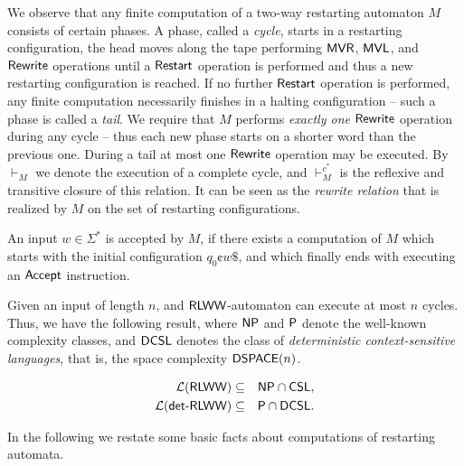 We observe that any finite computation of a two-way restarting automaton $M$ consists of certain phases. A phase, called a \emph{cycle}, starts in a restarting configuration, the head moves along the tape performing \index{$\MVR$}$\MVR$, \index{$\MVL$}$\MVL$, and \index{$\Rewrite$}$\Rewrite$ operations until a \index{$\Restart$}$\Restart$ operation is performed and thus a new restarting configuration is reached. If no further \index{$\Restart$}$\Restart$ operation is performed, any finite computation necessarily finishes in a halting configuration -- such a phase is called a \emph{tail}. We require that $M$ performs \emph{exactly one} \index{$\Rewrite$}$\Rewrite$ operation during any cycle -- thus each new phase starts on a shorter word than the previous one. During a tail at most one \index{$\Rewrite$}$\Rewrite$ operation may be executed. By $\vdash_M$ we denote the execution of a complete cycle, and $\vdash_M^{c^*}$ is the reflexive and transitive closure of this relation. It can be seen as the \emph{rewrite relation} that is realized by $M$ on the set of restarting configurations.

An input $w \in \Sigma^*$ is accepted by $M$, if there exists a computation of $M$ which starts with the initial configuration  $q_0 \cent w \$$, and which finally ends with executing an \index{$\Accept$}$\Accept$ instruction.

Given an input of length $n$, and $\textup{\sf RLWW}$-automaton can execute at most $n$ cycles. Thus, we have the following result, where $\textup{\sf NP}$ and $\textup{\sf P}$ denote the well-known complexity classes, and $\textup{\sf DCSL}$ denotes the class of \emph{deterministic context-sensitive languages}, that is, the space complexity $\textup{\sf DSPACE}(n)$.

\begin{proposition}
\begin{eqnarray*}
{\cal L}(\textup{\sf RLWW}) & \subseteq & \textup{\sf NP} \cap \textup{\sf CSL},\\
{\cal L}(\textup{\sf det-RLWW}) & \subseteq & \textup{\sf P} \cap \textup{\sf DCSL}.
\end{eqnarray*}
\end{proposition}

In the following we restate some basic facts about computations of restarting automata.

